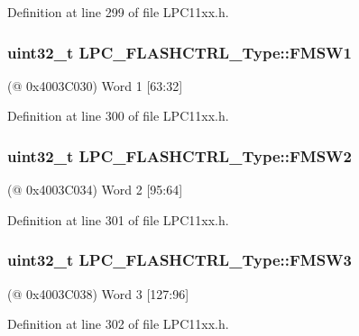 Definition at line 299 of file L\+P\+C11xx.\+h.

\subsubsection[{\texorpdfstring{F\+M\+S\+W1}{FMSW1}}]{ uint32\+\_\+t L\+P\+C\+\_\+\+F\+L\+A\+S\+H\+C\+T\+R\+L\+\_\+\+Type\+::\+F\+M\+S\+W1}\hypertarget{group___l_p_c11xx___definitions_gabc341282b3494e79a8ca5ba5eb563559}{}\label{group___l_p_c11xx___definitions_gabc341282b3494e79a8ca5ba5eb563559}
(@ 0x4003\+C030) Word 1 \mbox{[}63\+:32\mbox{]} 

Definition at line 300 of file L\+P\+C11xx.\+h.

\subsubsection[{\texorpdfstring{F\+M\+S\+W2}{FMSW2}}]{ uint32\+\_\+t L\+P\+C\+\_\+\+F\+L\+A\+S\+H\+C\+T\+R\+L\+\_\+\+Type\+::\+F\+M\+S\+W2}\hypertarget{group___l_p_c11xx___definitions_ga409818874ee3d884138c96416fafe2ca}{}\label{group___l_p_c11xx___definitions_ga409818874ee3d884138c96416fafe2ca}
(@ 0x4003\+C034) Word 2 \mbox{[}95\+:64\mbox{]} 

Definition at line 301 of file L\+P\+C11xx.\+h.

\subsubsection[{\texorpdfstring{F\+M\+S\+W3}{FMSW3}}]{ uint32\+\_\+t L\+P\+C\+\_\+\+F\+L\+A\+S\+H\+C\+T\+R\+L\+\_\+\+Type\+::\+F\+M\+S\+W3}\hypertarget{group___l_p_c11xx___definitions_gae2b52687fb425ae91ed7937501dfc036}{}\label{group___l_p_c11xx___definitions_gae2b52687fb425ae91ed7937501dfc036}
(@ 0x4003\+C038) Word 3 \mbox{[}127\+:96\mbox{]} 

Definition at line 302 of file L\+P\+C11xx.\+h.


